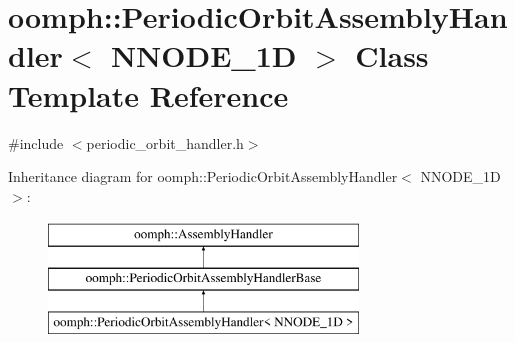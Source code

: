 \hypertarget{classoomph_1_1PeriodicOrbitAssemblyHandler}{}\section{oomph\+:\+:Periodic\+Orbit\+Assembly\+Handler$<$ N\+N\+O\+D\+E\+\_\+1D $>$ Class Template Reference}
\label{classoomph_1_1PeriodicOrbitAssemblyHandler}


{\ttfamily \#include $<$periodic\+\_\+orbit\+\_\+handler.\+h$>$}

Inheritance diagram for oomph\+:\+:Periodic\+Orbit\+Assembly\+Handler$<$ N\+N\+O\+D\+E\+\_\+1D $>$\+:\begin{figure}[H]
\begin{center}
\leavevmode
\includegraphics[height=3.000000cm]{classoomph_1_1PeriodicOrbitAssemblyHandler}
\end{center}
\end{figure}
